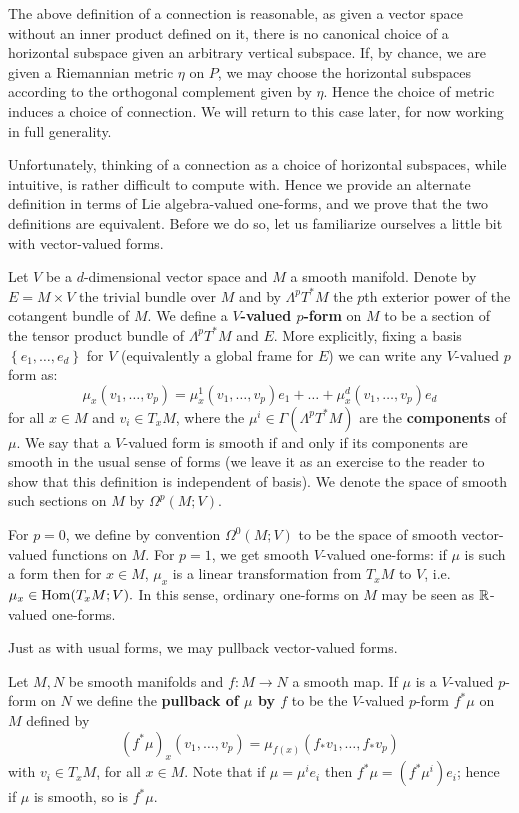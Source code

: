 The above definition of a connection is reasonable, as given a vector space without an inner product defined on it, there is no canonical choice
of a horizontal subspace given an arbitrary vertical subspace. If, by chance, we are given a Riemannian metric $\eta$ on $P$, we may choose the horizontal
subspaces according to the orthogonal complement given by $\eta$. Hence the choice of metric induces a choice of connection.
We will return to this case later, for now working in full generality.

Unfortunately, thinking of a connection as a choice of horizontal subspaces,
while intuitive, is rather difficult to compute with. Hence we provide an alternate definition in terms of Lie algebra-valued one-forms, and we
prove that the two definitions are equivalent. Before we do so, let us familiarize ourselves a little bit with vector-valued forms.

\begin{defn}
    Let $V$ be a $d$-dimensional vector space and $M$ a smooth manifold. Denote by $E=M\times V$ the trivial bundle over $M$ and by $\Lambda^pT^*M$ the
    $p$th exterior power of the cotangent bundle of $M$.
    We define a \textbf{$V$-valued $p$-form} on $M$ to be a section of the tensor product bundle of $\Lambda^pT^*M$ and $E$.
    More explicitly, fixing a basis $\left\{ e_1,\ldots,e_d \right\}$ for $V$ (equivalently a global frame for $E$) we can write any $V$-valued $p$ form as:
    \[\mu_x(v_1,\ldots,v_p)=\mu_x^1(v_1,\ldots,v_p)e_1+\ldots+\mu_x^d(v_1,\ldots,v_p)e_d\]
    for all $x\in M$ and $v_i\in T_xM$, where the $\mu^i\in\Gamma(\Lambda^pT^*M)$ are the \textbf{components} of $\mu$. We say that a $V$-valued
    form is smooth if and only if its components are smooth in the usual sense of forms (we leave it as an exercise to the reader to show
    that this definition is independent of basis).
    We denote the space of smooth such sections on $M$ by $\Omega^p(M;V).$

    For $p=0$, we define by convention $\Omega^0(M;V)$ to be the space of smooth vector-valued functions on $M$.
    For $p=1$, we get smooth $V$-valued one-forms: if $\mu$ is such a form then for $x\in M$, $\mu_x$
    is a linear transformation from $T_xM$ to $V$, i.e. $\mu_x\in\operatorname{Hom}(T_xM;V).$ In this sense, ordinary one-forms on $M$
    may be seen as $\mathbb{R}$-valued one-forms.
\end{defn}

Just as with usual forms, we may pullback vector-valued forms.
\begin{defn}
    Let $M,N$ be smooth manifolds and $f:M\to N$ a smooth map. If $\mu$ is a $V$-valued $p$-form on $N$ we define the \textbf{pullback of $\mu$ by $f$}
    to be the $V$-valued $p$-form $f^*\mu$ on $M$ defined by
    \[(f^*\mu)_x(v_1,\ldots,v_p)=\mu_{f(x)}(f_*v_1,\ldots,f_*v_p)\]
    with $v_i\in T_xM$, for all $x\in M$. Note that if $\mu=\mu^ie_i$ then $f^*\mu=(f^*\mu^i)e_i$; hence if $\mu$ is smooth, so is $f^*\mu$.
\end{defn}

